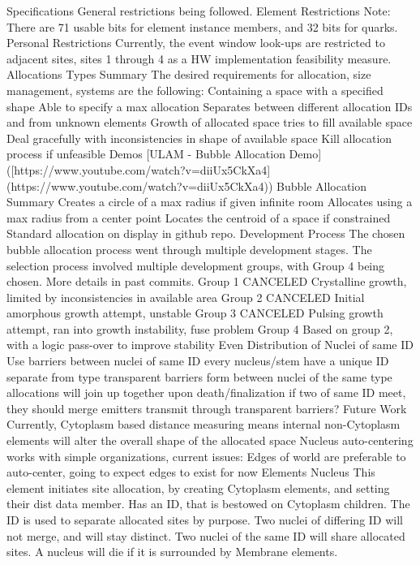 \documentclass[article,12pt,oneside]{memoir}
\begin{document}
Specifications
General restrictions being followed.
Element Restrictions
Note: There are 71 usable bits for element instance members, and 32 bits for quarks.
Personal Restrictions
Currently, the event window look-ups are restricted to adjacent sites, sites 1 through 4 as a HW implementation feasibility measure.
Allocations Types
Summary
The desired requirements for allocation, size management, systems are the following:
Containing a space with a specified shape
Able to specify a max allocation
Separates between different allocation IDs and from unknown elements
Growth of allocated space tries to fill available space
Deal gracefully with inconsistencies in shape of available space
Kill allocation process if unfeasible
Demos
[ULAM - Bubble Allocation Demo]([https://www.youtube.com/watch?v=diiUx5CkXa4](https://www.youtube.com/watch?v=diiUx5CkXa4))
Bubble Allocation
Summary
Creates a circle of a max radius if given infinite room
Allocates using a max radius from a center point
Locates the centroid of a space if constrained
Standard allocation on display in github repo.
Development Process
The chosen bubble allocation process went through multiple development stages. The selection process involved multiple development groups, with Group 4 being chosen. More details in past commits.
Group 1 CANCELED 
Crystalline growth, limited by inconsistencies in available area
Group 2 CANCELED 
Initial amorphous growth attempt, unstable
Group 3 CANCELED 
Pulsing growth attempt, ran into growth instability, fuse problem
Group 4
Based on group 2, with a logic pass-over to improve stability
Even Distribution of Nuclei of same ID
Use barriers between nuclei of same ID
every nucleus/stem have a unique ID separate from type
transparent barriers form between nuclei of the same type
allocations will join up together upon death/finalization
if two of same ID meet, they should merge
emitters transmit through transparent barriers?
Future Work
Currently, Cytoplasm based distance measuring means internal non-Cytoplasm elements will alter the overall shape of the allocated space
Nucleus auto-centering works with simple organizations, current issues:
Edges of world are preferable to auto-center, going to expect edges to exist for now
Elements
Nucleus
This element initiates site allocation, by creating Cytoplasm elements, and setting their dist data member.
Has an ID, that is bestowed on Cytoplasm children.
The ID is used to separate allocated sites by purpose.
Two nuclei of differing ID will not merge, and will stay distinct.
Two nuclei of the same ID will share allocated sites.
A nucleus will die if it is surrounded by Membrane elements.
\end{document}

